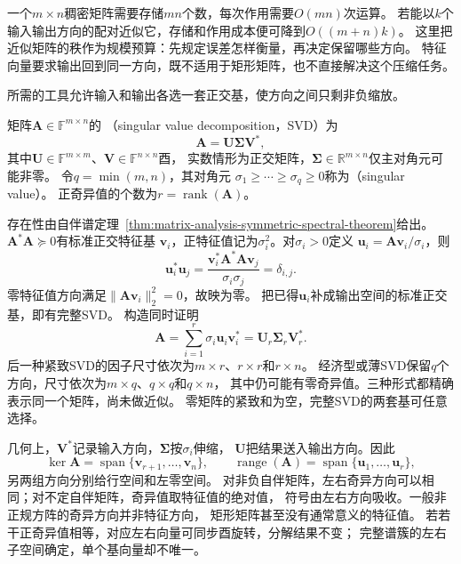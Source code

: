 一个$m\times n$稠密矩阵需要存储$mn$个数，每次作用需要$O(mn)$次运算。
若能以$k$个输入输出方向的配对近似它，存储和作用成本便可降到$O((m+n)k)$。
这里把近似矩阵的秩作为规模预算：先规定误差怎样衡量，再决定保留哪些方向。
特征向量要求输出回到同一方向，既不适用于矩形矩阵，也不直接解决这个压缩任务。

所需的工具允许输入和输出各选一套正交基，使方向之间只剩非负缩放。
\begin{definition}[奇异值分解]
\label{def:matrix-analysis-svd}
矩阵$\bm A\in\mathbb F^{m\times n}$的
（singular value decomposition，SVD）为
\begin{equation}
 \bm A=\bm U\bm\Sigma\bm V^*,
 \label{eq:matrix-analysis-svd}
\end{equation}
其中$\bm U\in\mathbb F^{m\times m}$、$\bm V\in\mathbb F^{n\times n}$酉，
实数情形为正交矩阵，$\bm\Sigma\in\mathbb R^{m\times n}$仅主对角元可能非零。
令$q=\min(m,n)$，其对角元
$\sigma_1\geq\cdots\geq\sigma_q\geq0$称为（singular value）。
正奇异值的个数为$r=\operatorname{rank}(\bm A)$。
\end{definition}

存在性由自伴谱定理~\ref{thm:matrix-analysis-symmetric-spectral-theorem}给出。$\bm A^*\bm A\succeq0$有标准正交特征基
$\bm v_i$，正特征值记为$\sigma_i^2$。对$\sigma_i>0$定义
$\bm u_i=\bm A\bm v_i/\sigma_i$，则
\[
 \bm u_i^*\bm u_j
 =\frac{\bm v_i^*\bm A^*\bm A\bm v_j}{\sigma_i\sigma_j}
 =\delta_{i,j}.
\]
零特征值方向满足$\lVert\bm A\bm v_i\rVert_2^2=0$，故映为零。
把已得$\bm u_i$补成输出空间的标准正交基，即有完整SVD。
构造同时证明
\begin{equation}
 \bm A=\sum_{i=1}^r\sigma_i\bm u_i\bm v_i^*
       =\bm U_r\bm\Sigma_r\bm V_r^*.
 \label{eq:matrix-analysis-svd-rank-one-sum}
\end{equation}
后一种紧致SVD的因子尺寸依次为$m\times r$、$r\times r$和$r\times n$。
经济型或薄SVD保留$q$个方向，尺寸依次为$m\times q$、$q\times q$和$q\times n$，
其中仍可能有零奇异值。三种形式都精确表示同一个矩阵，尚未做近似。
零矩阵的紧致和为空，完整SVD的两套基可任意选择。

几何上，$\bm V^*$记录输入方向，$\bm\Sigma$按$\sigma_i$伸缩，
$\bm U$把结果送入输出方向。因此
\[
 \ker\bm A=\operatorname{span}\{\bm v_{r+1},\ldots,\bm v_n\},\qquad
 \operatorname{range}(\bm A)=\operatorname{span}\{\bm u_1,\ldots,\bm u_r\},
\]
另两组方向分别给行空间和左零空间。
对非负自伴矩阵，左右奇异方向可以相同；对不定自伴矩阵，奇异值取特征值的绝对值，
符号由左右方向吸收。一般非正规方阵的奇异方向并非特征方向，
矩形矩阵甚至没有通常意义的特征值。
若若干正奇异值相等，对应左右向量可同步酉旋转，分解结果不变；
完整谱簇的左右子空间确定，单个基向量却不唯一。


